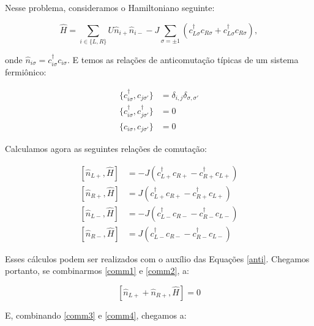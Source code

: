 Nesse problema, consideramos o Hamiltoniano seguinte:

\begin{equation}
\hat{H} = \sum_{i \in \{ L,R \}} U \hat{n}_{i+} \hat{n}_{i-}
   - J \sum_{\sigma = \pm 1} ( c_{L\sigma}^{\dagger} c_{R\sigma}
   + c_{L\sigma}^{\dagger} c_{R\sigma}),
\end{equation}

onde $\hat{n}_{i\sigma} = c_{i\sigma}^{\dagger} c_{i\sigma}$. E temos as relações de anticomutação típicas de um sistema fermiônico:

\begin{subequations}
\begin{align}
\{ c_{i\sigma}^{\dagger},c_{j\sigma'}\}&=\delta_{i,j} \delta_{\sigma,\sigma'} \label{anti1} \\
\{ c_{i\sigma}^{\dagger},c_{j\sigma'}^{\dagger}\}&=0 \label{anti2} \\
\{ c_{i\sigma},c_{j\sigma'}\}&=0 \label{anti3}
\end{align}
\label{anti}
\end{subequations}

Calculamos agora as seguintes relações de comutação:

\begin{subequations}
\begin{align}
\left[ \hat{n}_{L+}, \hat{H} \right] &= -J \left(
c_{L+}^{\dagger} c_{R+} - c_{R+}^{\dagger} c_{L+} \right) \label{comm1} \\
\left[ \hat{n}_{R+}, \hat{H} \right] &= J \left(
c_{L+}^{\dagger} c_{R+} - c_{R+}^{\dagger} c_{L+} \right) \label{comm2} \\
\left[ \hat{n}_{L-}, \hat{H} \right] &= -J \left(
c_{L-}^{\dagger} c_{R-} - c_{R-}^{\dagger} c_{L-} \right) \label{comm3} \\
\left[ \hat{n}_{R-}, \hat{H} \right] &= J \left(
c_{L-}^{\dagger} c_{R-} - c_{R-}^{\dagger} c_{L-} \right) \label{comm4}
\end{align}
\label{comm}
\end{subequations}

Esses cálculos podem ser realizados com o auxílio das Equações \eqref{anti}. Chegamos portanto, se combinarmos \eqref{comm1} e \eqref{comm2}, a:

\begin{equation}
\left[ \hat{n}_{L+} + \hat{n}_{R+}, \hat{H} \right] = 0
\end{equation}

E, combinando \eqref{comm3} e \eqref{comm4}, chegamos a:

